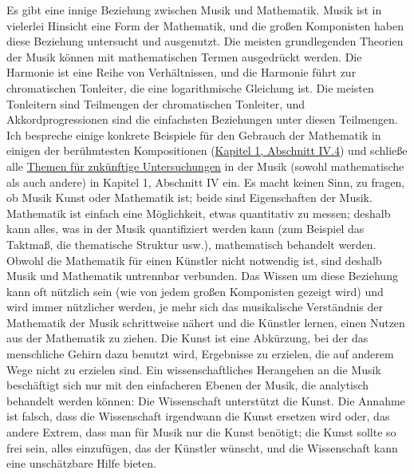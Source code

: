 Es gibt eine innige Beziehung zwischen Musik und Mathematik.
Musik ist in vielerlei Hinsicht eine Form der Mathematik, und die großen Komponisten haben diese Beziehung untersucht und ausgenutzt.
Die meisten grundlegenden Theorien der Musik können mit mathematischen Termen ausgedrückt werden.
Die Harmonie ist eine Reihe von Verhältnissen, und die Harmonie führt zur chromatischen Tonleiter, die eine logarithmische Gleichung ist.
Die meisten Tonleitern sind Teilmengen der chromatischen Tonleiter, und Akkordprogressionen sind die einfachsten Beziehungen unter diesen Teilmengen.
Ich bespreche einige konkrete Beispiele für den Gebrauch der Mathematik in einigen der berühmtesten Kompositionen (\hyperref[c1iv4]{Kapitel 1, Abschnitt IV.4}) und schließe alle \hyperref[c1iv6]{Themen für zukünftige Untersuchungen} in der Musik (sowohl mathematische als auch andere) in Kapitel 1, Abschnitt IV ein.
Es macht keinen Sinn, zu fragen, ob Musik Kunst oder Mathematik ist; beide sind Eigenschaften der Musik.
Mathematik ist einfach eine Möglichkeit, etwas quantitativ zu messen; deshalb kann alles, was in der Musik quantifiziert werden kann (zum Beispiel das Taktmaß, die thematische Struktur usw.), mathematisch behandelt werden.
Obwohl die Mathematik für einen Künstler nicht notwendig ist, sind deshalb Musik und Mathematik untrennbar verbunden.
Das Wissen um diese Beziehung kann oft nützlich sein (wie von jedem großen Komponisten gezeigt wird) und wird immer nützlicher werden, je mehr sich das musikalische Verständnis der Mathematik der Musik schrittweise nähert und die Künstler lernen, einen Nutzen aus der Mathematik zu ziehen.
Die Kunst ist eine Abkürzung, bei der das menschliche Gehirn dazu benutzt wird, Ergebnisse zu erzielen, die auf anderem Wege nicht zu erzielen sind.
Ein wissenschaftliches Herangehen an die Musik beschäftigt sich nur mit den einfacheren Ebenen der Musik, die analytisch behandelt werden können: Die Wissenschaft unterstützt die Kunst.
Die Annahme ist falsch, dass die Wissenschaft irgendwann die Kunst ersetzen wird oder, das andere Extrem, dass man für Musik nur die Kunst benötigt; die Kunst sollte so frei sein, alles einzufügen, das der Künstler wünscht, und die Wissenschaft kann eine unschätzbare Hilfe bieten.

